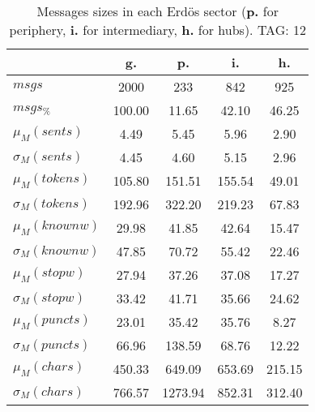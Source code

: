 \begin{table}[h!]
\begin{center}
\begin{tabular}{| l | c | c | c | c |}\hline
 & g. & p. & i. & h. \\\hline
$msgs$ & 2000  & 233  & 842  & 925 \\\hline
$msgs_{\%}$ & 100.00  & 11.65  & 42.10  & 46.25 \\\hline
$\mu_M(sents)$ & 4.49  & 5.45  & 5.96  & 2.90 \\\hline
$\sigma_M(sents)$ & 4.45  & 4.60  & 5.15  & 2.96 \\\hline
$\mu_M(tokens)$ & 105.80  & 151.51  & 155.54  & 49.01 \\\hline
$\sigma_M(tokens)$ & 192.96  & 322.20  & 219.23  & 67.83 \\\hline
$\mu_M(knownw)$ & 29.98  & 41.85  & 42.64  & 15.47 \\\hline
$\sigma_M(knownw)$ & 47.85  & 70.72  & 55.42  & 22.46 \\\hline
$\mu_M(stopw)$ & 27.94  & 37.26  & 37.08  & 17.27 \\\hline
$\sigma_M(stopw)$ & 33.42  & 41.71  & 35.66  & 24.62 \\\hline
$\mu_M(puncts)$ & 23.01  & 35.42  & 35.76  & 8.27 \\\hline
$\sigma_M(puncts)$ & 66.96  & 138.59  & 68.76  & 12.22 \\\hline
$\mu_M(chars)$ & 450.33  & 649.09  & 653.69  & 215.15 \\\hline
$\sigma_M(chars)$ & 766.57  & 1273.94  & 852.31  & 312.40 \\\hline
\end{tabular}
\caption{Messages sizes in each Erd\"os sector ({{\bf p.}} for periphery, {{\bf i.}} for intermediary, {{\bf h.}} for hubs). TAG: 12}
\end{center}
\end{table}